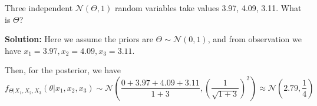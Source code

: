 \begin{eg}
  Three independent \(\mathcal{N}(\Theta, 1)\) random variables take values 3.97, 4.09, 3.11. What is \(\Theta\)? 
  
  \textbf{Solution:} 
  Here we assume the priors are \(\Theta \sim \mathcal{N} (0, 1)\), and from observation we have \(x_1 = 3.97, x_2 = 4.09, x_3 = 3.11\). 

  Then, for the posterior, we have 
  \[
    f_{\Theta \vert X_1, X_2, X_3} (\theta \vert x_1, x_2, x_3) \sim \mathcal{N} \left(\dfrac{0 + 3.97 + 4.09 + 3.11}{1 + 3}, \left(\dfrac{1}{\sqrt{1 + 3}}\right)^2\right) \approx \mathcal{N} (2.79, \dfrac{1}{4})
  \]
\end{eg}

